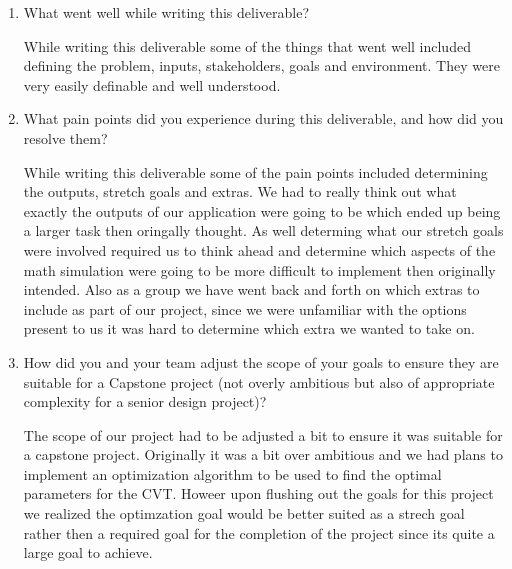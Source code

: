 \documentclass{article}
\begin{document}


\begin{enumerate}
    \item What went well while writing this deliverable? 

    While writing this deliverable some of the things that went well included defining the problem, inputs, stakeholders, goals and environment. They were very easily definable and well understood.

    \item What pain points did you experience during this deliverable, and how
    did you resolve them?

    While writing this deliverable some of the pain points included determining the outputs, stretch goals and extras. We had to really think out what exactly the outputs of our application were going to be which ended up being a larger task then oringally thought. As well determing what our stretch goals were involved required us to think ahead and determine which aspects of the math simulation were going to be more difficult to implement then originally intended. Also as a group we have went back and forth on which extras to include as part of our project, since we were unfamiliar with the options present to us it was hard to determine which extra we wanted to take on.

    \item How did you and your team adjust the scope of your goals to ensure
    they are suitable for a Capstone project (not overly ambitious but also of
    appropriate complexity for a senior design project)?

    The scope of our project had to be adjusted a bit to ensure it was suitable for a capstone project. Originally it was a bit over ambitious and we had plans to implement an optimization algorithm to be used to find the optimal parameters for the CVT. Howeer upon flushing out the goals for this project we realized the optimzation goal would be better suited as a strech goal rather then a required goal for the completion of the project since its quite a large goal to achieve.
\end{enumerate}  
\end{document}

